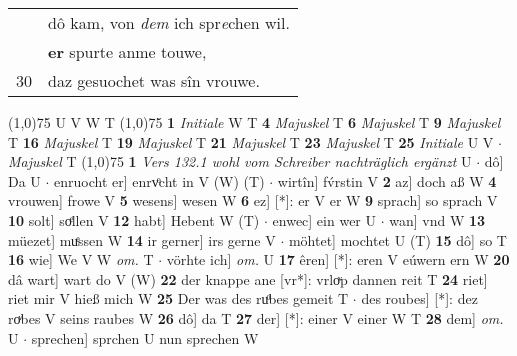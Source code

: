 \documentclass[8pt,a4paper,notitlepage]{article}
\begin{document}
\begin{table}[ht]
\begin{minipage}[t]{0.5\linewidth}
\begin{tabular}{rl}
 & dô kam, von \textit{dem} ich spr\textit{e}chen wil.\\ 
 & \textbf{er} spurte anme touwe,\\ 
30 & daz gesuochet was sîn vrouwe.\\ 
\end{tabular}
\scriptsize
\line(1,0){75} \newline
U V W T \newline
\line(1,0){75} \newline
\textbf{1} \textit{Initiale} W T  \textbf{4} \textit{Majuskel} T  \textbf{6} \textit{Majuskel} T  \textbf{9} \textit{Majuskel} T  \textbf{16} \textit{Majuskel} T  \textbf{19} \textit{Majuskel} T  \textbf{21} \textit{Majuskel} T  \textbf{23} \textit{Majuskel} T  \textbf{25} \textit{Initiale} U V   $\cdot$ \textit{Majuskel} T  \newline
\line(1,0){75} \newline
\textbf{1} \textit{Vers 132.1 wohl vom Schreiber nachträglich ergänzt} U   $\cdot$ dô] Da U  $\cdot$ enruocht er] enrvͦcht in V (W) (T)  $\cdot$ wirtîn] fv́rstin V \textbf{2} az] doch aß W \textbf{4} vrouwen] frowe V \textbf{5} wesens] wesen W \textbf{6} ez] [*]: er V er W \textbf{9} sprach] so sprach V \textbf{10} solt] soͤllen V \textbf{12} habt] Hebent W (T)  $\cdot$ enwec] ein wer U  $\cdot$ wan] vnd W \textbf{13} müezet] muͤssen W \textbf{14} ir gerner] irs gerne V  $\cdot$ möhtet] mochtet U (T) \textbf{15} dô] so T \textbf{16} wie] We V W \textit{om.} T  $\cdot$ vörhte ich] \textit{om.} U \textbf{17} êren] [*]: eren V eúwern ern W \textbf{20} dâ wart] wart do V (W) \textbf{22} der knappe ane [vr*]: vrloͮp dannen reit T \textbf{24} riet] riet mir V hieß mich W \textbf{25} Der was des ruͦbes gemeit T  $\cdot$ des roubes] [*]: dez roͮbes V seins raubes W \textbf{26} dô] da T \textbf{27} der] [*]: einer V einer W T \textbf{28} dem] \textit{om.} U  $\cdot$ sprechen] sprchen U nun sprechen W \newline
\end{minipage}
\end{table}
\end{document}
